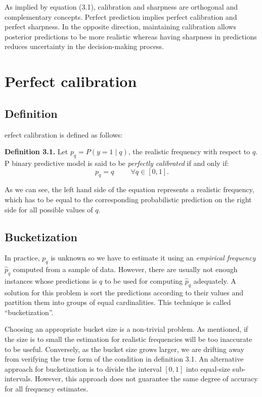 As implied by equation (3.1), calibration and sharpness are orthogonal and complementary concepts. Perfect prediction implies perfect calibration and perfect sharpness. In the opposite direction, maintaining calibration allows posterior predictions to be more realistic whereas having sharpness in predictions reduces uncertainty in the decision-making process.   

\section{Perfect calibration}

\subsection{Definition}

erfect calibration is defined as follows:

\textbf{Definition 3.1.} Let $p_q = P(y = 1 \mid q)$, the realistic frequency with respect to $q$. P binary predictive model is said to be \textit{perfectly calibrated} if and only if:
$$p_q = q \hspace{1cm} \forall q \in [0, 1].$$  

As we can see, the left hand side of the equation represents a realistic frequency, which has to be equal to the corresponding probabilistic prediction on the right side for all possible values of $q$. 

\subsection{Bucketization}

In practice, $p_q$ is unknown so we have to estimate it using an \textit{empirical frequency} $\hat{p}_q$ computed from a sample of data. However, there are usually not enough instances whose predictions is $q$ to be used for computing $\hat{p}_q$ adequately. A solution for this problem is sort the predictions according to their values and partition them into groups of equal cardinalities. This technique is called ``bucketization''. 

Choosing an appropriate bucket size is a non-trivial problem. As mentioned, if the size is to small the estimation for realistic frequencies will be too inaccurate to be useful. Conversely, as the bucket size grows larger, we are drifting away from verifying the true form of the condition in definition 3.1. An alternative approach for bucketization is to divide the interval $[0, 1]$ into equal-size sub-intervals. However, this approach does not guarantee the same degree of accuracy for all frequency estimates.    

